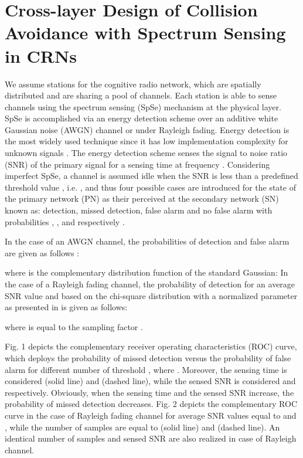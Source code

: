 \documentclass
[journal,11pt,draftclsnofoot,onecolumn,doublespace]{tETN2e}
\begin{document}
\section{Cross-layer Design of Collision Avoidance with Spectrum Sensing in CRNs}

We assume  stations for the cognitive radio network, which are spatially distributed and are sharing a pool of channels. Each station is able to sense  channels using the spectrum sensing (SpSe) mechanism at the physical layer. SpSe is accomplished via an energy detection scheme over an additive white Gaussian noise (AWGN) channel or under Rayleigh fading. Energy detection is the most widely used technique since it has low implementation complexity for unknown signals \citep{yucek09}. The energy detection scheme senses the signal to noise ratio (SNR)  of the primary signal for a sensing time  at frequency . Considering imperfect SpSe, a channel is assumed idle when the SNR  is less than a predefined threshold value , i.e. , and thus four possible cases are introduced for the state of the primary network (PN) as their perceived at the secondary network (SN) known as: detection, missed detection, false alarm and no false alarm with probabilities  , ,  and  respectively \citep{liang08}. 

In the case of an AWGN channel, the probabilities of detection  and false alarm  are given as follows \citep{liang08}: 


where  is the complementary distribution function of the standard Gaussian: 
In the case of a Rayleigh fading channel, the probability of detection  for an average SNR value  and based on the chi-square distribution with a normalized parameter  as presented in \citep{digham07} is given as follows: 
 
where  is equal to the sampling factor . 

Fig. 1 depicts the complementary receiver operating characteristics (ROC) curve, which deploys the probability of missed detection  versus the probability of false alarm  for different number of threshold , where . Moreover, the sensing time is considered  (solid line) and  (dashed line), while the sensed SNR is considered   and   respectively. Obviously, when the sensing time and the sensed SNR increase, the probability of missed detection decreases. Fig. 2 depicts the complementary ROC curve in the case of Rayleigh fading channel for average SNR values equal to  and , while the number of samples are equal to  (solid line) and  (dashed line). An identical number of samples and sensed SNR are also realized in case of Rayleigh channel.  
\end{document}
